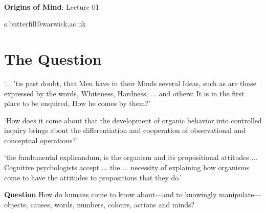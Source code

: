 \documentclass[12pt]{extarticle}
\date{}
\makeatletter
\def \ititle {Origins of Mind}
\def \isubtitle {Lecture 01}
\def \iemail{s.butterfill@warwick.ac.uk}
\makeatother
\begin{document}
\begin{multicols}{3}

\setlength\footnotesep{1em}










\def \ititle {Origins of Mind}
 
\def \isubtitle {Lecture 01}
 
 
 
\
 
 
 
\begin{center}
 
{\Large
 
\textbf{\ititle}: \isubtitle
 
}
 
 
 
\iemail %
 
\end{center}
 
 
 
\section{The Question}
 
‘... ’tis past doubt, that Men have in their Minds several Ideas, such as are those expressed by the words, Whiteness, Hardness, ... and others: It is in the first place to be enquired, How he comes by them?’
\citep[p.\ 104]{Locke:1975qo}
 
‘How does it come about that the development of organic behavior into controlled inquiry brings about the differentiation and cooperation of observational and conceptual operations?’
\citep[p.\ 12]{Dewey:1938yp}
 
‘the fundamental explicandum, is the organism and its propositional attitudes ... Cognitive psychologists accept ... the ... necessity of explaining how organisms come to have the attitudes to propositions that they do.’
\citep[p.\ 198]{Fodor:1975pb}
 
\textbf{Question}
How do humans come to know about---and to knowingly manipulate---objects, causes, words, numbers, colours, actions and minds?
 

\end{multicols}
\end{document}
